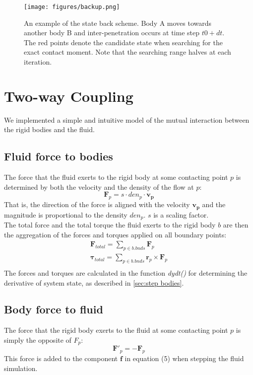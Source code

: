 \begin{figure}[H]
\centering
  \texttt{[image: figures/backup.png]}
  \caption{An example of the state back scheme. Body A moves towards another body B and inter-penetration occurs at time step $t0+dt$. The red points denote the candidate state when searching for the exact contact moment. Note that the searching range halves at each iteration.}
  \label{fig:backup}
\end{figure}

\section{Two-way Coupling}
We implemented a simple and intuitive model of the mutual interaction between the rigid bodies and the fluid.
\subsection{Fluid force to bodies}
\label{sec:fluid force}
The force that the fluid exerts to the rigid body at some contacting point $p$ is determined by both the velocity and the density of the flow at $p$:
\begin{equation*}
    \mathbf{F}_{p}=s\cdot den_p \cdot \mathbf{v_p}
\end{equation*}
That is, the direction of the force is aligned with the velocity $\mathbf{v_p}$ and the magnitude is proportional to the density $den_p$. $s$ is a scaling factor. \\
The total force and the total torque the fluid exerts to the rigid body $b$ are then the aggregation of the forces and torques applied on all boundary points:
\begin{gather*}
    \mathbf{F}_{total}=\sum_{p\in b.bnds}^{}\mathbf{F}_p\\
    \mathbf{\tau}_{total}=\sum_{p\in b.bnds}^{}\mathbf{r}_p \times \mathbf{F}_p\\
\end{gather*}
The forces and torques are calculated in the function \emph{dydt()} for determining the derivative of system state, as described in \autoref{sec:step bodies}. 

\subsection{Body force to fluid}
The force that the rigid body exerts to the fluid at some contacting point $p$ is simply the opposite of $F_p$:
\begin{equation*}
    \mathbf{F}'_p=-\mathbf{F}_p
\end{equation*}
This force is added to the component $\mathbf{f}$ in equation (5) when stepping the fluid simulation.

